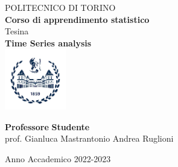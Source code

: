 \begin{titlepage}

\begin{center}

{\huge POLITECNICO DI TORINO}\\[1.5cm]
\textbf{Corso di apprendimento statistico}\\[3cm]

{\Large Tesina}\\[1cm]
\textbf{\LARGE Time Series analysis}\\[2cm]
\includegraphics[width=0.2\textwidth]{./polito.png}
\vspace{4cm}


\begin{minipage}{0.85\textwidth}
\begin{flushleft}\large
\textbf{Professore} \hfill \textbf{Studente}\\
prof. Gianluca Mastrantonio \hfill Andrea Ruglioni\\
\end{flushleft}
\end{minipage}

\vfill

Anno Accademico 2022-2023
\end{center}

\restoregeometry %

\end{titlepage}